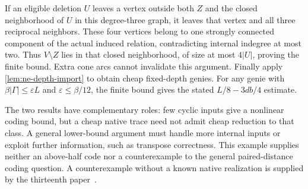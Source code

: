 \begin{informalproof}
If an eligible deletion $U$ leaves a vertex outside both $Z$ and the
closed neighborhood of $U$ in this degree-three graph, it leaves
that vertex and all three reciprocal neighbors. These four vertices
belong to one strongly connected component of the actual induced
relation, contradicting internal indegree at most two.
Thus $V\setminus Z$ lies in that closed neighborhood, of size at most
$4|U|$, proving the finite bound. Extra cone arcs cannot invalidate
this argument. Finally apply \cref{lem:ne-depth-import} to obtain
cheap fixed-depth genies. For any genie with
$\beta|\Gamma|\le\varepsilon L$ and $\varepsilon\le\beta/12$,
the finite bound gives the stated $L/8-3db/4$ estimate.
\end{informalproof}

The two results have complementary roles: few cyclic inputs give a
nonlinear coding bound, but a cheap native trace need not admit cheap
reduction to that class. A general lower-bound argument must handle
more internal inputs or exploit further information, such as transpose
correctness. This example supplies neither an above-half code nor a
counterexample to the general paired-distance coding question.
A counterexample without a known native realization is supplied by the
thirteenth paper~\cite{StorageCodes2026}.
